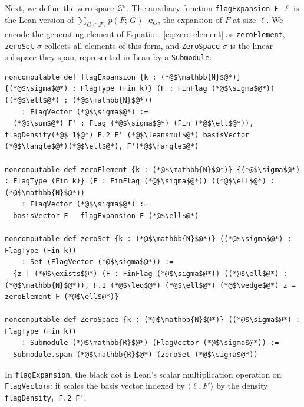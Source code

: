 \documentclass{article}
\newcommand{\den}[2]{p(#1;\,#2)}
\newcommand{\lean}[1]{\texttt{#1}}
\newcommand{\leansmul}{\mathbin{\vcenter{\hbox{$\scriptstyle\bullet$}}}}
\begin{document}
Next, we define the zero space $\mathcal{Z}^\sigma$.  The auxiliary function
\lean{flagExpansion F}~$\ell$ is the Lean version of
$\sum_{G \in \mathcal{F}^\sigma_\ell} \den{F}{G}\cdot \mathbf e_G$, the expansion of
$F$ at size $\ell$.  We encode the generating element of
Equation~\eqref{eq:zero-element} as \lean{zeroElement}, \lean{zeroSet} $\sigma$
collects all elements of this form, and \lean{ZeroSpace} $\sigma$ is the
linear subspace they span, represented in Lean by a \lean{Submodule}:
\begin{lstlisting}
noncomputable def flagExpansion {k : (*@$\mathbb{N}$@*)} {(*@$\sigma$@*) : FlagType (Fin k)} (F : FinFlag (*@$\sigma$@*)) ((*@$\ell$@*) : (*@$\mathbb{N}$@*))
    : FlagVector (*@$\sigma$@*) :=
  (*@$\sum$@*) F' : Flag (*@$\sigma$@*) (Fin (*@$\ell$@*)), flagDensity(*@$_1$@*) F.2 F' (*@$\leansmul$@*) basisVector (*@$\langle$@*)(*@$\ell$@*), F'(*@$\rangle$@*)

noncomputable def zeroElement {k : (*@$\mathbb{N}$@*)} {(*@$\sigma$@*) : FlagType (Fin k)} (F : FinFlag (*@$\sigma$@*)) ((*@$\ell$@*) : (*@$\mathbb{N}$@*))
    : FlagVector (*@$\sigma$@*) :=
  basisVector F - flagExpansion F (*@$\ell$@*)

noncomputable def zeroSet {k : (*@$\mathbb{N}$@*)} ((*@$\sigma$@*) : FlagType (Fin k))
    : Set (FlagVector (*@$\sigma$@*)) :=
  {z | (*@$\exists$@*) (F : FinFlag (*@$\sigma$@*)) ((*@$\ell$@*) : (*@$\mathbb{N}$@*)), F.1 (*@$\leq$@*) (*@$\ell$@*) (*@$\wedge$@*) z = zeroElement F (*@$\ell$@*)}

noncomputable def ZeroSpace {k : (*@$\mathbb{N}$@*)} ((*@$\sigma$@*) : FlagType (Fin k))
    : Submodule (*@$\mathbb{R}$@*) (FlagVector (*@$\sigma$@*)) :=
  Submodule.span (*@$\mathbb{R}$@*) (zeroSet (*@$\sigma$@*))
\end{lstlisting}
In \lean{flagExpansion}, the black dot is Lean's scalar multiplication
operation on \lean{FlagVector}s: it scales the basis vector indexed by
\(\langle\ell, F'\rangle\) by the density \lean{flagDensity$_1$ F.2 F'}.
\end{document}
